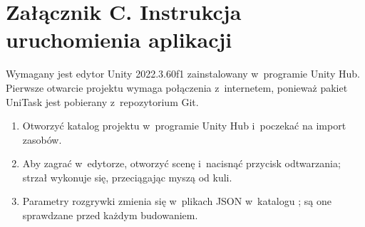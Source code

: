 \section*{Załącznik C. Instrukcja uruchomienia aplikacji}

Wymagany jest edytor Unity 2022.3.60f1 zainstalowany w~programie Unity Hub. Pierwsze
otwarcie projektu wymaga połączenia z~internetem, ponieważ pakiet UniTask jest pobierany
z~repozytorium Git.
\begin{enumerate}[leftmargin=1.9cm, itemsep=0pt]
  \item Otworzyć katalog projektu w~programie Unity Hub i~poczekać na import zasobów.
  \item Aby zagrać w~edytorze, otworzyć scenę 
        i~nacisnąć przycisk odtwarzania; strzał wykonuje się, przeciągając myszą od kuli.
  \item Parametry rozgrywki zmienia się w~plikach JSON w~katalogu
        ; są one sprawdzane przed każdym budowaniem.
\end{enumerate}
